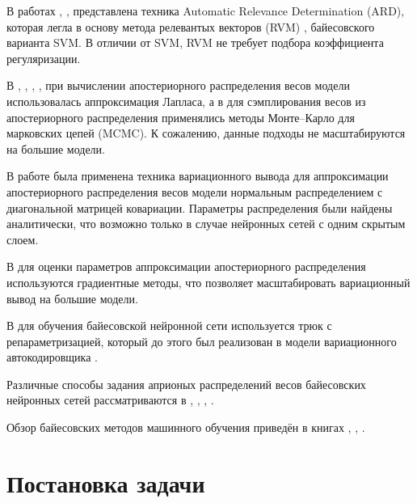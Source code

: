 \documentclass{article}
\numberwithin{equation}{section}
\begin{document}
    В работах \cite{mackay_1994}, \cite{mackay_1995}, \cite{nea_96}
    представлена техника Automatic Relevance Determination (ARD),
    которая легла в основу метода релевантых векторов (RVM) \cite{tipping_01},
    байесовского варианта SVM.
    В отличии от SVM, RVM не требует подбора коэффициента регуляризации.

    В \cite{mackay_1992a}, \cite{mackay_1992b}, \cite{mackay_1992c},
    \cite{mackay_1994}, \cite{mackay_1995}
    при вычислении апостериорного распределения весов модели использовалась
    аппроксимация Лапласа, а в \cite{nea_96} для сэмплирования весов
    из апостериорного распределения применялись методы
    Монте--Карло для марковских цепей (MCMC).
    К сожалению, данные подходы не масштабируются на большие модели.

    В работе \cite{hinton_van_camp_1993} была применена техника вариационного вывода
    для аппроксимации апостериорного распределения весов модели
    нормальным распределением с диагональной матрицей ковариации.
    Параметры распределения были найдены аналитически,
    что возможно только в случае нейронных сетей
    с одним скрытым слоем.

    В \cite{gra_11} для оценки параметров аппроксимации апостериорного распределения
    используются градиентные методы, что позволяет масштабировать вариационный вывод
    на большие модели.

    В \cite{blu_15} для обучения байесовской нейронной сети
    используется трюк с репараметризацией, который до этого был реализован в модели
    вариационного автокодировщика \cite{kingma_2013}.

    Различные способы задания априоных распределений весов
    байесовских нейронных сетей рассматриваются в
    \cite{nal_18}, \cite{wi_20}, \cite{hoe_21}, \cite{for_22}.

    Обзор байесовских методов машинного обучения приведён в книгах
    \cite{bishop2006}, \cite{murphy_book_1}, \cite{murphy_book_2}.

    \section{Постановка задачи}
\end{document}
